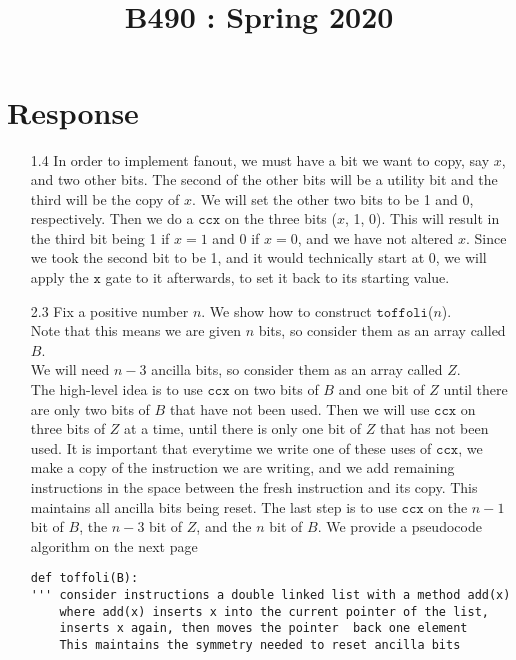 \documentclass[11pt]{article}
\title{
    \vspace{2in}
    \textmd{\textbf{\tit}}\\
    \normalsize\vspace{0.1in}\small{B490 : Spring 2020 }\\
    \vspace{0.1in}\large{\textit{\auths}}
    \vspace{3in}
}
\date{}
\begin{document}
\maketitle
\pagebreak

\section{Response}

\begin{enumerate}


\item[1.4] In order to implement fanout, we must have a bit we want to copy, say $x$, and two other bits. The second of the other bits will be a utility bit and
  the third will be the copy of $x$.
  We will set the other two bits to be 1 and 0, respectively.
  Then we do a $\texttt{ccx}$ on the three bits ($x$, 1, 0). This will result
  in the third bit being 1 if $x = 1$ and 0 if $x = 0$, and we have not altered $x$.
  Since we took the second bit to be 1, and it would technically start at 0, we will
  apply the $\texttt{x}$ gate to it afterwards, to set it back to its starting value.


  
\item[2.3] Fix a positive number $n$. We show how to construct $\texttt{toffoli}$($n$).\\
  Note that this means we are given $n$ bits, so consider them as an array called $B$.\\
  We will need $n-3$ ancilla bits, so consider them as an array called $Z$. \\
  The high-level idea is to use $\texttt{ccx}$ on two bits of $B$ and one bit of $Z$ until there are only two bits of $B$ that have not been used.
  Then we will use $\texttt{ccx}$ on three bits of $Z$ at a time, until there is only one bit of $Z$ that has not been used.
  It is important that everytime we write one of these uses of $\texttt{ccx}$, we make a
  copy of the instruction we are writing, and we add remaining instructions in the space between the fresh instruction and its copy. This maintains all ancilla bits being reset.
  The last step is to use $\texttt{ccx}$ on the $n-1$ bit of $B$, the $n-3$ bit of $Z$, and the $n$ bit of $B$.
  We provide a pseudocode algorithm on the next page
\newpage
  \begin{lstlisting}
def toffoli(B):
''' consider instructions a double linked list with a method add(x)
    where add(x) inserts x into the current pointer of the list,
    inserts x again, then moves the pointer  back one element
    This maintains the symmetry needed to reset ancilla bits


\end{lstlisting}
\end{enumerate}
\end{document}
